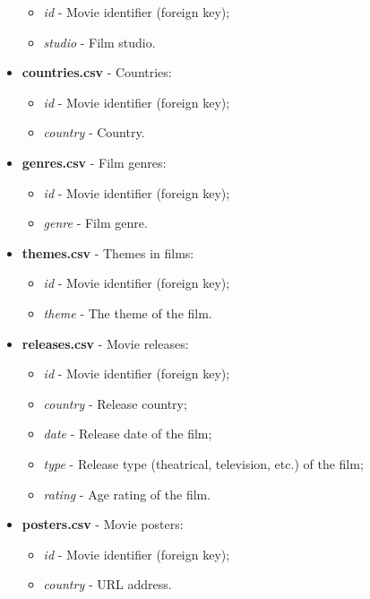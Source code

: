 \documentclass{Configuration_Files/PoliMi3i_thesis}
\begin{document}
\begin{itemize}
\begin{itemize}
        \item \textit{id} - Movie identifier (foreign key);
        \item \textit{studio} - Film studio.
    \end{itemize}
    \item \textbf{countries.csv} - Countries:
    \begin{itemize}
        \item \textit{id} - Movie identifier (foreign key);
        \item \textit{country} - Country.
    \end{itemize}
    \item \textbf{genres.csv} - Film genres:
    \begin{itemize}
        \item \textit{id} - Movie identifier (foreign key);
        \item \textit{genre} - Film genre.
    \end{itemize}
    \item \textbf{themes.csv} - Themes in films:
    \begin{itemize}
        \item \textit{id} - Movie identifier (foreign key);
        \item \textit{theme} - The theme of the film.
    \end{itemize}
    \item \textbf{releases.csv} - Movie releases:
    \begin{itemize}
        \item \textit{id} - Movie identifier (foreign key);
        \item \textit{country} - Release country;
        \item \textit{date} - Release date of the film;
        \item \textit{type} - Release type (theatrical, television, etc.) of the film;
        \item \textit{rating} - Age rating of the film.
    \end{itemize}
    \item \textbf{posters.csv} - Movie posters:
    \begin{itemize}
        \item \textit{id} - Movie identifier (foreign key);
        \item \textit{country} - URL address.
    \end{itemize}
\end{itemize}
\end{document}
